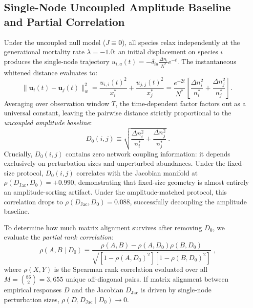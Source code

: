 \documentclass[11pt,a4paper]{article}
\begin{document}
\subsection{Single-Node Uncoupled Amplitude Baseline and Partial Correlation}

Under the uncoupled null model ($J \equiv 0$), all species relax independently at the generational mortality rate $\lambda = -1.0$: an initial displacement on species $i$ produces the single-node trajectory $u_{i,a}(t) = -\delta_{ia} \frac{\Delta n_i}{N^*} e^{-t}$. The instantaneous whitened distance evaluates to:
\begin{equation}
\|\mathbf{u}_i(t) - \mathbf{u}_j(t)\|_w^2 = \frac{u_{i,i}(t)^2}{x_i^*} + \frac{u_{j,j}(t)^2}{x_j^*} = \frac{e^{-2t}}{N^*} \left[ \frac{\Delta n_i^2}{n_i^*} + \frac{\Delta n_j^2}{n_j^*} \right].
\end{equation}
Averaging over observation window $T$, the time-dependent factor factors out as a universal constant, leaving the pairwise distance strictly proportional to the \emph{uncoupled amplitude baseline}:
\begin{equation}
\boxed{\;D_0(i,j) \equiv \sqrt{\frac{\Delta n_i^2}{n_i^*} + \frac{\Delta n_j^2}{n_j^*}}\;.}
\label{eq:D0_supp2}
\end{equation}
Crucially, $D_0(i,j)$ contains zero network coupling information: it depends exclusively on perturbation sizes and unperturbed abundances. Under the fixed-size protocol, $D_0(i,j)$ correlates with the Jacobian manifold at $\rho(D_{\mathrm{Jac}}, D_0) = +0.990$, demonstrating that fixed-size geometry is almost entirely an amplitude-sorting artifact. Under the amplitude-matched protocol, this correlation drops to $\rho(D_{\mathrm{Jac}}, D_0) = 0.088$, successfully decoupling the amplitude baseline.

To determine how much matrix alignment survives after removing $D_0$, we evaluate the \emph{partial rank correlation}:
\begin{equation}
\boxed{\;\rho(A, B \mid D_0) \equiv \frac{\rho(A, B) - \rho(A, D_0)\rho(B, D_0)}{\sqrt{[1 - \rho(A, D_0)^2][1 - \rho(B, D_0)^2]}}\;,}
\label{eq:partial_rank_corr}
\end{equation}
where $\rho(X, Y)$ is the Spearman rank correlation evaluated over all $M = \binom{86}{2} = 3{,}655$ unique off-diagonal pairs. If matrix alignment between empirical responses $D$ and the Jacobian $D_{\mathrm{Jac}}$ is driven by single-node perturbation sizes, $\rho(D, D_{\mathrm{Jac}} \mid D_0) \to 0$.
\end{document}
